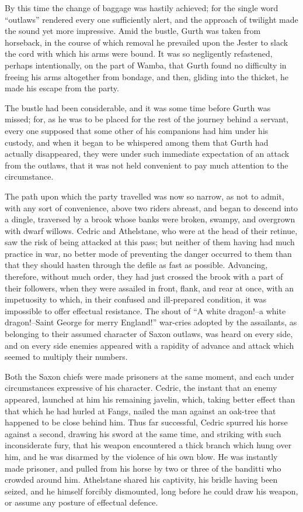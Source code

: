 By this time the change of baggage was hastily achieved; for the single
word ``outlaws'' rendered every one sufficiently alert, and the approach
of twilight made the sound yet more impressive. Amid the bustle, Gurth
was taken from horseback, in the course of which removal he prevailed
upon the Jester to slack the cord with which his arms were bound. It was
so negligently refastened, perhaps intentionally, on the part of Wamba,
that Gurth found no difficulty in freeing his arms altogether from
bondage, and then, gliding into the thicket, he made his escape from the
party.

The bustle had been considerable, and it was some time before Gurth was
missed; for, as he was to be placed for the rest of the journey behind a
servant, every one supposed that some other of his companions had him
under his custody, and when it began to be whispered among them that
Gurth had actually disappeared, they were under such immediate
expectation of an attack from the outlaws, that it was not held
convenient to pay much attention to the circumstance.

The path upon which the party travelled was now so narrow, as not to
admit, with any sort of convenience, above two riders abreast, and began
to descend into a dingle, traversed by a brook whose banks were broken,
swampy, and overgrown with dwarf willows. Cedric and Athelstane, who
were at the head of their retinue, saw the risk of being attacked at
this pass; but neither of them having had much practice in war, no
better mode of preventing the danger occurred to them than that they
should hasten through the defile as fast as possible. Advancing,
therefore, without much order, they had just crossed the brook with a
part of their followers, when they were assailed in front, flank, and
rear at once, with an impetuosity to which, in their confused and
ill-prepared condition, it was impossible to offer effectual resistance.
The shout of ``A white dragon!--a white dragon!--Saint George for merry
England!'' war-cries adopted by the assailants, as belonging to their
assumed character of Saxon outlaws, was heard on every side, and on
every side enemies appeared with a rapidity of advance and attack which
seemed to multiply their numbers.

Both the Saxon chiefs were made prisoners at the same moment, and each
under circumstances expressive of his character. Cedric, the instant
that an enemy appeared, launched at him his remaining javelin, which,
taking better effect than that which he had hurled at Fangs, nailed the
man against an oak-tree that happened to be close behind him. Thus far
successful, Cedric spurred his horse against a second, drawing his sword
at the same time, and striking with such inconsiderate fury, that his
weapon encountered a thick branch which hung over him, and he was
disarmed by the violence of his own blow. He was instantly made
prisoner, and pulled from his horse by two or three of the banditti who
crowded around him. Athelstane shared his captivity, his bridle having
been seized, and he himself forcibly dismounted, long before he could
draw his weapon, or assume any posture of effectual defence.

